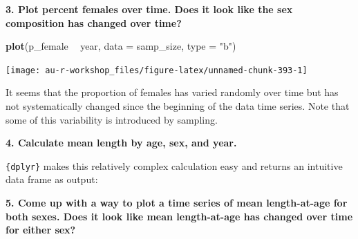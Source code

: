 \documentclass[]{book}
\newenvironment{Shaded}{\begin{snugshade}}{\end{snugshade}}
\newcommand{\KeywordTok}[1]{\textcolor[rgb]{0.13,0.29,0.53}{\textbf{#1}}}
\newcommand{\DataTypeTok}[1]{\textcolor[rgb]{0.13,0.29,0.53}{#1}}
\newcommand{\StringTok}[1]{\textcolor[rgb]{0.31,0.60,0.02}{#1}}
\newcommand{\OperatorTok}[1]{\textcolor[rgb]{0.81,0.36,0.00}{\textbf{#1}}}
\newcommand{\NormalTok}[1]{#1}
\theoremstyle{definition}
\theoremstyle{definition}
\theoremstyle{definition}
\theoremstyle{remark}
\begin{document}
\textbf{3. Plot percent females over time. Does it look like the sex
composition has changed over time?}

\begin{Shaded}
\begin{Highlighting}[]
\KeywordTok{plot}\NormalTok{(p_female }\OperatorTok{~}\StringTok{ }\NormalTok{year, }\DataTypeTok{data =}\NormalTok{ samp_size, }\DataTypeTok{type =} \StringTok{"b"}\NormalTok{)}
\end{Highlighting}
\end{Shaded}

\begin{center}\texttt{[image: au-r-workshop\_files/figure-latex/unnamed-chunk-393-1]} \end{center}

It seems that the proportion of females has varied randomly over time
but has not systematically changed since the beginning of the data time
series. Note that some of this variability is introduced by sampling.

\textbf{4. Calculate mean length by age, sex, and year.}

\texttt{\{dplyr\}} makes this relatively complex calculation easy and
returns an intuitive data frame as output:

\begin{Shaded}
\end{Shaded}

\textbf{5. Come up with a way to plot a time series of mean
length-at-age for both sexes. Does it look like mean length-at-age has
changed over time for either sex?}
\end{document}
